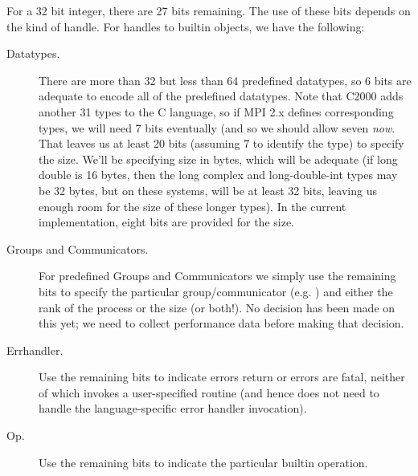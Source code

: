 \documentclass{article}
\begin{document}

For a 32 bit integer, there are 27 bits remaining.
The use of these bits depends on the kind of handle.  For handles to
builtin objects, we have the following:

\begin{description}
\item[Datatypes.]
There are more than 32 but less than 64 predefined datatypes, so 6 bits are
adequate to encode all of the predefined datatypes.
Note that C2000 adds another 31 types to the C language, so if MPI 2.x
defines corresponding types, we will need 7 bits eventually (and so we
should allow seven \emph{now}.
That leaves us at least 20 bits (assuming 7 to identify the type)
to specify the size.  We'll be specifying size in bytes,
which will be adequate (if long double is 16 bytes, then the long complex and
long-double-int types may be 32 bytes, but on these systems,
 will
be at least 32 bits, leaving us enough room for the size of these longer
types).  In the current implementation, eight bits are provided for
the size.

\item[Groups and Communicators.]
For predefined Groups and Communicators we simply use the remaining bits
to specify the particular group/communicator (e.g. ) and 
either the rank of the process or the size (or both!).  No decision
has been made on this yet; we need to collect performance data before
making that decision.


\item[Errhandler.] Use the remaining bits to indicate errors return or
errors are fatal, neither of which invokes a user-specified routine
(and hence does not need to handle the language-specific error handler
invocation).

\item[Op.] Use the remaining bits to indicate the particular builtin operation.


\end{description}
\end{document}
